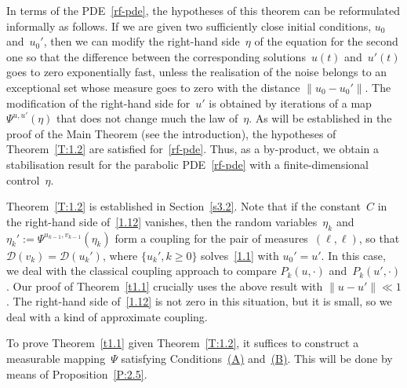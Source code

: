 \documentclass[JEP,XML,SOM,Unicode,ThmDefs]{cedram}
\let\mathcal\mathscr
\theoremstyle{plain}
\numberwithin{equation}{section}
\newcommand{\DD}{{\mathcal D}}
\begin{document}
\begin{remark}
In terms of the PDE~\eqref{rf-pde}, the hypotheses of this theorem can be reformulated informally as follows. If we are given two sufficiently close initial conditions, $u_0$ and~$u_0'$, then we can modify the right-hand side~$\eta$ of the equation for the second one so that the difference between the corresponding solutions~$u(t)$ and~$u'(t)$ goes to zero exponentially fast, unless the realisation of the noise belongs to an exceptional set whose measure goes to zero with the distance $\|u_0-u_0'\|$. The modification of the right-hand side for~$u'$ is obtained by iterations of a map $\Psi^{u,u'}(\eta)$ that does not change much the law of~$\eta$. As will be established in the proof of the Main Theorem (see the introduction), the hypotheses of Theorem~\ref{T:1.2} are satisfied for~\eqref{rf-pde}. Thus, as a by-product, we obtain a stabilisation result for the parabolic PDE~\eqref{rf-pde} with a finite-dimensional control~$\eta$.
\end{remark}

Theorem~\ref{T:1.2} is established in Section~\ref{s3.2}. Note that if the constant~$C$ in the right-hand side of~\eqref{1.12} vanishes, then the random variables~$\eta_k$ and $\eta_k':=\varPsi^{u_{k-1},v_{k-1}}(\eta_k)$ form a coupling for the pair of measures~$(\ell,\ell)$, so that $\DD(v_k)\!=\!\DD(u_k')$, where \hbox{$\{u_k',k\!\ge\!0\}$} solves~\eqref{1.1} with $u_0'=u'$. In this case, we deal with the classical coupling approach to compare $P_k(u,\cdot)$ and~$P_k(u',\cdot)$. Our proof of Theorem~\ref{t1.1} crucially uses the above result with $\|u-u'\|\ll1$. The right-hand side of~\eqref{1.12} is not zero in this situation, but it is small, so we deal with a kind of approximate coupling.

To prove Theorem~\ref{t1.1} given Theorem~\ref{T:1.2}, it suffices to construct a measurable mapping~$\varPsi$ satisfying Conditions~\hyperlink{(A)}{(A)} and~\hyperlink{(B)}{(B)}. This will be done by means of Proposition~\ref{P:2.5}.
\end{document}
